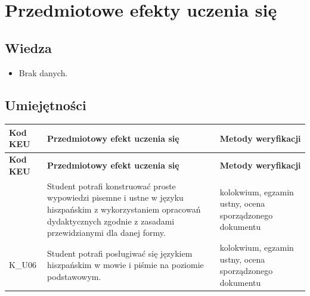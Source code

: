 \documentclass[12pt, a4paper]{article}
\newcommand{\thdrule}{\noalign{\global\setlength{\extrarowheight}{0pt}}}
\newcommand{\thdend}{\noalign{\global\setlength{\extrarowheight}{3pt}}}
\begin{document}
\section{Przedmiotowe efekty uczenia się}

\subsection*{Wiedza}
\begin{itemize}
  \item Brak danych.
\end{itemize}

\subsection*{Umiejętności}
{\scriptsize
\begin{longtable}{m{1.6cm}m{9.0cm}m{4.2cm}}
\thdrule\toprule
\rowcolor{pjatkRed} {\color{white}\footnotesize\textbf{\vphantom{Ag}Kod KEU}} & {\color{white}\footnotesize\textbf{\vphantom{Ag}Przedmiotowy efekt uczenia się}} & {\color{white}\footnotesize\textbf{\vphantom{Ag}Metody weryfikacji}} \\
\midrule\thdend
\endfirsthead
\thdrule\toprule
\rowcolor{pjatkRed} {\color{white}\footnotesize\textbf{\vphantom{Ag}Kod KEU}} & {\color{white}\footnotesize\textbf{\vphantom{Ag}Przedmiotowy efekt uczenia się}} & {\color{white}\footnotesize\textbf{\vphantom{Ag}Metody weryfikacji}} \\
\midrule\thdend
\endhead
  \rowcolor{tableRowLight}  & Student potrafi konstruować proste wypowiedzi pisemne i ustne w języku hiszpańskim z wykorzystaniem opracowań dydaktycznych zgodnie z zasadami przewidzianymi dla danej formy. & kolokwium, egzamin ustny, ocena sporządzonego dokumentu \\
  \rowcolor{tableRowAlt} K\_U06 & Student potrafi posługiwać się językiem hiszpańskim w mowie i piśmie na poziomie podstawowym. & kolokwium, egzamin ustny, ocena sporządzonego dokumentu \\
\bottomrule
\end{longtable}}
\end{document}
